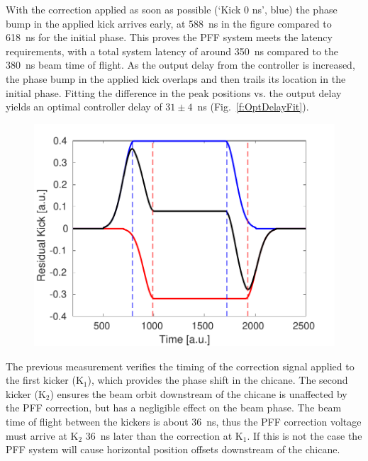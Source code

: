 \documentclass[%
 reprint,
 superscriptaddress,
 amsmath,
 amssymb,
 prstab,
]{revtex4-1}
\begin{document}
With the correction applied as soon as possible (`Kick 0 ns', blue) the phase 
bump in the applied kick arrives early, at 588~ns in the figure compared to 
618~ns for the initial phase. This proves the PFF system meets the latency 
requirements, with a total system latency of around 350~ns compared to the 
380~ns beam time of flight. As the output delay from the controller is 
increased, the phase bump in the applied kick overlaps and then trails its 
location in the initial phase. Fitting the difference in the peak positions vs. 
the output delay yields an optimal controller delay of \(31\pm4\)~ns 
(Fig.~\ref{f:OptDelayFit}).

\begin{figure}
	\includegraphics[width=\columnwidth]{figs/comis/relDelay_sim}%
	\caption{\label{f:relDelay_sim}
	}
\end{figure}

The previous measurement verifies the timing of the correction signal applied 
to the first kicker (\(\mathrm{K_1}\)), which provides the phase shift in the 
chicane. The second kicker (\(\mathrm{K_2}\)) ensures the beam orbit downstream 
of the chicane is unaffected by the PFF correction, but has a negligible effect 
on the beam phase. The beam time of flight between the kickers is about 36~ns, 
thus the PFF correction voltage must arrive at \(\mathrm{K_2}\) 36~ns later 
than the correction at \(\mathrm{K_1}\). If this is not the case the PFF system 
will cause horizontal position offsets downstream of the chicane.
\end{document}
